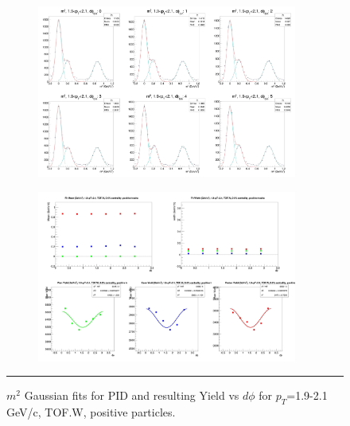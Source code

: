 \begin{figure}[H]
  \centering
    \begin{subfigure}[p]{1\textwidth}
   \centering
   \includegraphics[width=0.94\textwidth]{lowptfits/yieldvsdphi_tof1_cent0_ch1_pT-19-21.jpg}
    \end{subfigure}
    \begin{subfigure}[p]{1\textwidth}
   \centering
   \includegraphics[width=0.94\textwidth]{lowptfits/fitParams_tof1_cent0_ch1_pT-19-21.jpg}
    \end{subfigure}
    \rule{35em}{0.5pt}
  \caption[PID fits and Yield vs $d\phi$ for $p_T$=1.9-2.1 GeV/c, TOF.W, positive particles. ]{$m^2$ Gaussian fits for PID and resulting Yield vs $d\phi$ for $p_T$=1.9-2.1 GeV/c, TOF.W, positive particles.}
  \label{fig:fits19-21pos}
\end{figure}

